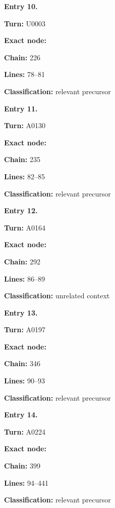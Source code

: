 \documentclass[10pt,a4paper,oneside]{report}
\begin{document}

\textbf{Entry 10.}

\textbf{Turn:} U0003

\textbf{Exact node:} \protect{}

\textbf{Chain:} 226

\textbf{Lines:} 78--81

\textbf{Classification:} relevant precursor


\textbf{Entry 11.}

\textbf{Turn:} A0130

\textbf{Exact node:} \protect{}

\textbf{Chain:} 235

\textbf{Lines:} 82--85

\textbf{Classification:} relevant precursor


\textbf{Entry 12.}

\textbf{Turn:} A0164

\textbf{Exact node:} \protect{}

\textbf{Chain:} 292

\textbf{Lines:} 86--89

\textbf{Classification:} unrelated context


\textbf{Entry 13.}

\textbf{Turn:} A0197

\textbf{Exact node:} \protect{}

\textbf{Chain:} 346

\textbf{Lines:} 90--93

\textbf{Classification:} relevant precursor


\textbf{Entry 14.}

\textbf{Turn:} A0224

\textbf{Exact node:} \protect{}

\textbf{Chain:} 399

\textbf{Lines:} 94--441

\textbf{Classification:} relevant precursor

\end{document}
